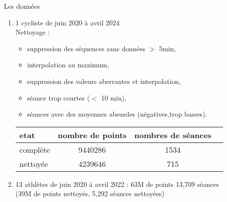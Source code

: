 \documentclass{beamer}
\begin{document}
\begin{frame}{Les données }
    \begin{enumerate}
        \item 1 cycliste de juin 2020 à avril 2024\\
        Nettoyage : 
    \begin{itemize}
        \item suppression des séquences sans données $>$ 5min,
        \item interpolation au maximum, 
        \item suppression des valeurs aberrantes et interpolation,
        \item séance trop courtes ($<$ 10 min),
        \item séances avec des moyennes absurdes (négatives,trop basses).
    
    \end{itemize}
    \begin{table}
        \centering
        \begin{tabular}{lccc}
            \hline
            \textbf{etat} & \textbf{nombre de point}s & \textbf{nombres de séances} \\
            \hline
            complète & 9440286 & 1534 \\
            nettoyée & 4239646& 715\\
            \hline
        \end{tabular}
    \end{table}
        \item 13 athlètes de juin 2020 à avril 2022  : 63M de points 13,709 séances \\
             (39M de points nettoyés, 5,292 séances nettoyées)
\end{enumerate}
\end{frame}
\end{document}
